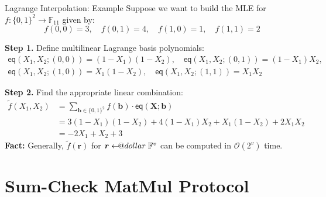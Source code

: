 \documentclass{zkdl-presentation-template}
\makeatletter
\newcommand\leftarrowS{\leftarrow\joinrel\smalldollar}
\newcommand{\smalldollar}{\mathrel{\mathpalette\small@dollar\relax}}
\newcommand{\small@dollar}[2]{%
  \vcenter{\hbox{%
    $#1\textnormal{\fontsize{0.7\dimexpr\f@size pt}{0}\selectfont\$}$%
  }}%
}
\makeatother
\begin{document}
    \begin{frame}{Lagrange Interpolation: Example}
        Suppose we want to build the MLE for $f: \{0,1\}^2 \to \mathbb{F}_{11}$ given by:
        \begin{equation*}
            f(0,0) = 3, \quad f(0,1) = 4, \quad f(1,0) = 1, \quad f(1,1) = 2
        \end{equation*}
        
        \vspace{-10px}

        \textcolor{green!50!black}{\textbf{Step 1.}} Define multilinear Lagrange basis polynomials:
        \begin{gather*}
            \mathsf{eq}(X_1,X_2;(0,0)) = (1-X_1)(1-X_2), \quad \mathsf{eq}(X_1,X_2;(0,1)) = (1-X_1)X_2, \\
            \mathsf{eq}(X_1,X_2;(1,0)) = X_1(1-X_2), \quad \mathsf{eq}(X_1,X_2;(1,1)) = X_1X_2
        \end{gather*}

        \vspace{-10px}

        \textcolor{blue!70!black}{\textbf{Step 2.}} Find the appropriate linear combination:
        \begin{align*}
            \widetilde{f}(X_1,X_2) &= \sum_{\boldsymbol{b} \in \{0,1\}^2} f(\boldsymbol{b}) \cdot \mathsf{eq}(\mathbf{X};\boldsymbol{b}) \\
            &= 3(1-X_1)(1-X_2) + 4(1-X_1)X_2 + X_1(1-X_2) + 2X_1X_2 \\
            &= \boxed{-2X_1 + X_2 + 3}
        \end{align*}
        \textbf{Fact:} Generally, $\widetilde{f}(\boldsymbol{r})$ for
        $\boldsymbol{r} \leftarrowS \mathbb{F}^v$ can be computed in
        $\mathcal{O}(2^v)$ time.
    \end{frame}

    \section{Sum-Check MatMul Protocol}
\end{document}

